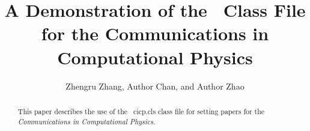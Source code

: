 \documentclass[mathpazo]{cicp}
\begin{document}
\title{A Demonstration of the \LaTeXe \ Class File for the
Communications in Computational Physics}


 \author[Zhang Z R et.~al.]{Zhengru Zhang\comma\corrauth,
       Author Chan, and Author Zhao}
 \address{\ School of Mathematical Sciences,
          Beijing Normal University,
          Beijing 100875, P.R. China. \\
           \ Department of Mathematics,
           Hong Kong Baptist University, Hong Kong SAR}


\begin{abstract}
This paper describes the use of the \LaTeXe \ {\sf cicp.cls} class file for
setting papers for the {\it Communications in Computational Physics}.
\end{abstract}

\keywords{\LaTeXe}
\end{document}
